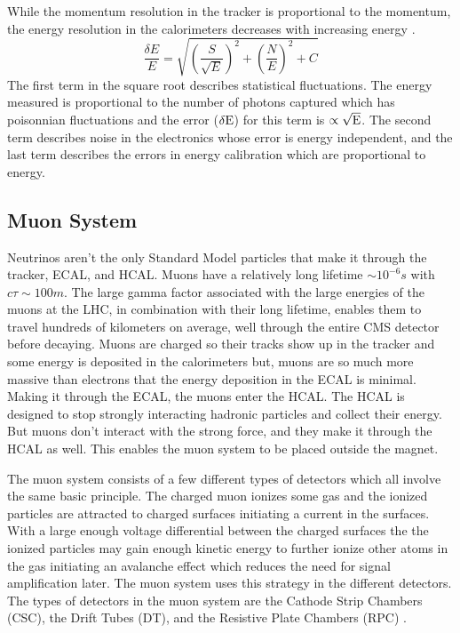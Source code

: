 While the momentum resolution in the tracker is proportional to the momentum, the energy resolution in the calorimeters decreases with increasing energy \cite{pdgreview}.
\begin{equation}
\frac{\delta E}{E} = \sqrt{\left(\frac{S}{\sqrt{E}}\right)^2 + \left(\frac{N}{E}\right)^2 + C}
\end{equation}
The first term in the square root describes statistical fluctuations. The energy measured is proportional to the number of photons captured which has poisonnian fluctuations and the error (${\rm \delta E}$) for this term is $\propto \sqrt{{\rm E}}$. The second term describes noise in the electronics whose error is energy independent, and the last term describes the errors in energy calibration which are proportional to energy.

\FloatBarrier
\subsection{Muon System}
Neutrinos aren't the only Standard Model particles that make it through the tracker, ECAL, and HCAL. Muons have a relatively long lifetime $\sim 10^{-6} s$  with $c\tau \sim 100 m$. The large gamma factor associated with the large energies of the muons at the LHC, in combination with their long lifetime, enables them to travel hundreds of kilometers on average, well through the entire CMS detector before decaying. Muons are charged so their tracks show up in the tracker and some energy is deposited in the calorimeters but, muons are so much more massive than electrons that the energy deposition in the ECAL is minimal. Making it through the ECAL, the muons enter the HCAL. The HCAL is designed to stop strongly interacting hadronic particles and collect their energy. But muons don't interact with the strong force, and they make it through the HCAL as well. This enables the muon system to be placed outside the magnet.

The muon system consists of a few different types of detectors which all involve the same basic principle. The charged muon ionizes some gas and the ionized particles are attracted to charged surfaces initiating a current in the surfaces. With a large enough voltage differential between the charged surfaces the the ionized particles may gain enough kinetic energy to further ionize other atoms in the gas initiating an avalanche effect which reduces the need for signal amplification later. The muon system uses this strategy in the different detectors. The types of detectors in the muon system are the Cathode Strip Chambers (CSC), the Drift Tubes (DT), and the Resistive Plate Chambers (RPC) \cite{tdr}.

